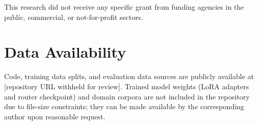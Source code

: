 \documentclass[a4paper,fleql,doubleblind]{cas-sc}
\begin{document}
This research did not receive any specific grant from funding agencies in
the public, commercial, or not-for-profit sectors.

\section*{Data Availability}
Code, training data splits, and evaluation data sources are publicly available
at [repository URL withheld for review]. Trained model weights (LoRA
adapters and router checkpoint) and domain corpora are not included in the
repository due to file-size constraints; they can be made available by the
corresponding author upon reasonable request.
\end{document}
